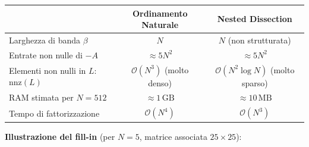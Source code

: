 \documentclass[a4paper,11pt]{article}
\theoremstyle{definition}
\begin{document}
\begin{center}
\begin{tabular}{lcc}
\toprule
& \textbf{Ordinamento Naturale} & \textbf{Nested Dissection} \\
\midrule
Larghezza di banda $\beta$ & $N$ & $N$ (non strutturata) \\
Entrate non nulle di $-A$  & $\approx 5N^2$ & $\approx 5N^2$ \\
Elementi non nulli in $L$: $\text{nnz}(L)$ & $\mathcal{O}(N^3)$ \quad (molto denso) & $\mathcal{O}(N^2\log N)$ \quad (molto sparso) \\
RAM stimata per $N=512$ & $\approx 1\,\text{GB}$ & $\approx 10\,\text{MB}$ \\
Tempo di fattorizzazione & $\mathcal{O}(N^4)$ & $\mathcal{O}(N^3)$ \\
\bottomrule
\end{tabular}
\end{center}


\noindent\textbf{Illustrazione del fill-in} (per $N=5$, matrice associata $25\times25$):
\end{document}
